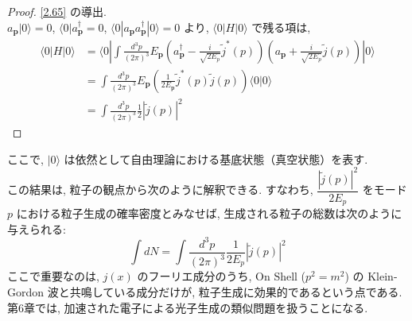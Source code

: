 \documentclass[a4paper,12pt]{article}
\begin{document}
\color{blue}
\begin{proof}
\eqref{2.65} の導出.\\
$a_{\mathbf{p}} | 0 \rangle = 0$, $\langle 0 | a^{\dagger}_{\mathbf{p}} = 0$, $\langle 0 | a_{\mathbf{p}} a^{\dagger}_{\mathbf{p}} | 0 \rangle = 0$ より, $\langle 0 | H | 0 \rangle$ で残る項は,
\begin{align*}
  \langle 0 | H | 0 \rangle &= \langle 0 | \int \frac{d^3 p}{(2\pi)^3} E_{\mathbf{p}} \left( a_{\mathbf{p}}^\dagger - \frac{i}{\sqrt{2E_p}} \tilde{j}^{*}(p) \right) \left( a_{\mathbf{p}} + \frac{i}{\sqrt{2E_p}} \tilde{j}(p) \right) | 0 \rangle \tag{2-4.n1}\\
  &= \int \frac{d^3 p}{(2\pi)^3} E_{\mathbf{p}} \left( \frac{1}{2E_{\mathbf{p}}} \tilde{j}^{*}(p) \tilde{j}(p) \right) \langle 0 | 0 \rangle \tag{2-4.n2}\\
  &= \int \frac{d^3 p}{(2\pi)^3} \frac{1}{2} |\tilde{j}(p)|^2 \tag{2-4.n3}
\end{align*}
\end{proof}
\color{black}

ここで, $|0\rangle$ は依然として自由理論における基底状態（真空状態）を表す.\\
この結果は, 粒子の観点から次のように解釈できる. すなわち, $\dfrac{|\tilde{j}(p)|^2}{2E_p}$ をモード $p$ における粒子生成の確率密度とみなせば, 生成される粒子の総数は次のように与えられる:
\begin{equation*}
\int dN = \int \frac{d^3 p}{(2\pi)^3} \frac{1}{2E_p} |\tilde{j}(p)|^2 \tag{2.66}
\end{equation*}
ここで重要なのは, $j(x)$ のフーリエ成分のうち, On Shell ($p^2 = m^2$) の Klein-Gordon 波と共鳴している成分だけが, 粒子生成に効果的であるという点である. 第6章では, 加速された電子による光子生成の類似問題を扱うことになる.
\end{document}
